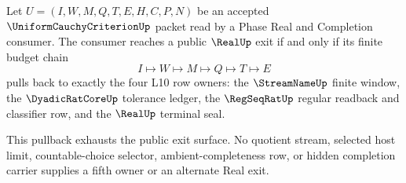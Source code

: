 \begin{theorem}
\label{thm:real-uniform-cauchy-budget-pullback-exhaustion}
Let $U=(I,W,M,Q,T,E,H,C,P,N)$ be an accepted $\UniformCauchyCriterionUp$
packet read by a Phase Real and Completion consumer. The consumer reaches a
public $\RealUp$ exit if and only if its finite budget chain
$$
I \longmapsto W \longmapsto M \longmapsto Q \longmapsto T \longmapsto E
$$
pulls back to exactly the four L10 row owners: the $\StreamNameUp$ finite
window, the $\DyadicRatCoreUp$ tolerance ledger, the $\RegSeqRatUp$ regular
readback and classifier row, and the $\RealUp$ terminal seal.

This pullback exhausts the public exit surface. No quotient stream, selected
host limit, countable-choice selector, ambient-completeness row, or hidden
completion carrier supplies a fifth owner or an alternate Real exit.
\end{theorem}
